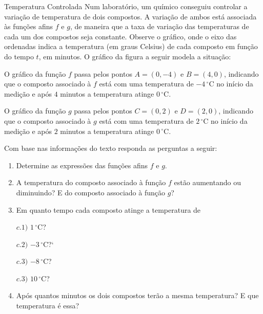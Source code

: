 \begin{task}{Temperatura Controlada}
\label{\detokenize{AF107-6:atividade-temperatura-controlada}}\label{\detokenize{AF107-6:id2}}
Num laboratório, um químico conseguiu controlar a variação de temperatura de dois compostos. A variação de ambos está associada às funções afins \(f\) e \(g\), de maneira que a taxa de variação das temperaturas de cada um dos compostos seja constante. Observe o gráfico, onde o eixo das ordenadas indica a temperatura (em graus Celsius) de cada composto em função do tempo \(t\), em minutos. O gráfico da figura a seguir modela a situação:

O gráfico da função \(f\) passa pelos pontos \(A=(0,-4)\) e \(B=(4,0)\), indicando que o composto associado à \(f\) está com uma temperatura de \(-4\,^{\circ}\mathrm{C}\) no início da medição e após \(4\) minutos a temperatura atinge \(0\,^{\circ}\mathrm{C}\).

O gráfico da função \(g\) passa pelos pontos \(C=(0,2)\) e \(D=(2,0)\), indicando que o composto associado à \(g\) está com uma temperatura de \(2\,^{\circ}\mathrm{C}\) no início da medição e após \(2\) minutos a temperatura atinge \(0\,^{\circ}\mathrm{C}\).

Com base nas informações do texto responda as perguntas a seguir:
\begin{enumerate}
\item {} 
Determine as expressões das funções afins \(f\) e \(g\).

\item {} 
A temperatura do composto associado à função \(f\) estão aumentando ou diminuindo? E do composto associado à função \(g\)?

\item {} 
Em quanto tempo cada composto atinge a temperatura de

\(c.1)\) \(1\,^{\circ}\mathrm{C}\)?

\(c.2)\) \(-3\,^{\circ}\mathrm{C}\)?{}`

\(c.3)\) \(-8\,^{\circ}\mathrm{C}\)?

\(c.3)\) \(10\,^{\circ}\mathrm{C}\)?

\item {} 
Após quantos minutos os dois compostos terão a mesma temperatura? E que temperatura é essa?

\end{enumerate}
\end{task}


